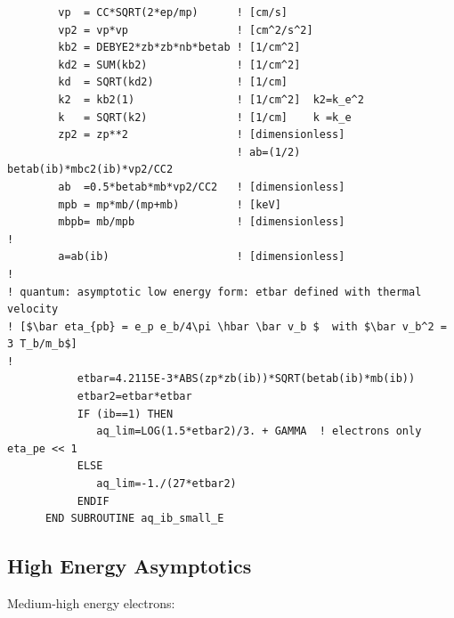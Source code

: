 \documentclass[preprint,12pt,eqsecnum,nofootinbib,amsmath,amssymb]{revtex4}
\begin{document}
{\begin{verbatim}
        vp  = CC*SQRT(2*ep/mp)      ! [cm/s]
        vp2 = vp*vp                 ! [cm^2/s^2]
        kb2 = DEBYE2*zb*zb*nb*betab ! [1/cm^2]
        kd2 = SUM(kb2)              ! [1/cm^2]
        kd  = SQRT(kd2)             ! [1/cm]
        k2  = kb2(1)                ! [1/cm^2]  k2=k_e^2
        k   = SQRT(k2)              ! [1/cm]    k =k_e
        zp2 = zp**2                 ! [dimensionless]
                                    ! ab=(1/2) betab(ib)*mbc2(ib)*vp2/CC2
        ab  =0.5*betab*mb*vp2/CC2   ! [dimensionless] 
        mpb = mp*mb/(mp+mb)         ! [keV]
        mbpb= mb/mpb                ! [dimensionless]
!
        a=ab(ib)                    ! [dimensionless] 
!
! quantum: asymptotic low energy form: etbar defined with thermal velocity
! [$\bar eta_{pb} = e_p e_b/4\pi \hbar \bar v_b $  with $\bar v_b^2 = 3 T_b/m_b$]
!
           etbar=4.2115E-3*ABS(zp*zb(ib))*SQRT(betab(ib)*mb(ib))
           etbar2=etbar*etbar
           IF (ib==1) THEN
              aq_lim=LOG(1.5*etbar2)/3. + GAMMA  ! electrons only eta_pe << 1
           ELSE
              aq_lim=-1./(27*etbar2)
           ENDIF
      END SUBROUTINE aq_ib_small_E
\end{verbatim}
}


\subsection{High Energy Asymptotics}

\noindent
Medium-high energy electrons:
\end{document}

